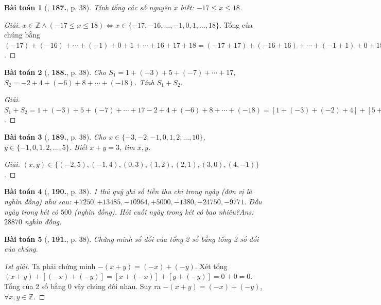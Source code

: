 \documentclass{article}
\numberwithin{equation}{section}
\newtheorem{baitoan}{Bài toán}
\begin{document}
\begin{baitoan}[\cite{Tuyen_Toan_6}, \textbf{187.}, p. 38]
	Tính tổng các số nguyên $x$ biết: $-17\le x\le18$.
\end{baitoan}

\begin{proof}[Giải]
	$x\in\mathbb{Z}\land(-17\le x\le18)\Leftrightarrow x\in\{-17,-16,\ldots,-1,0,1,\ldots,18\}$. Tổng của chúng bằng $(-17) + (-16) + \cdots + (-1) + 0 + 1 + \cdots + 16 + 17 + 18 = (-17 + 17) + (-16 + 16) + \cdots + (-1 + 1) + 0 + 18 = 0 + 0 + \cdots + 0 + 0 + 18 = 18$. 
\end{proof}

\begin{baitoan}[\cite{Tuyen_Toan_6}, \textbf{188.}, p. 38]
	Cho $S_1 = 1 + (-3) + 5 + (-7) + \cdots + 17$, $S_2 = -2 + 4 + (-6) + 8 + \cdots + (-18)$. Tính $S_1 + S_2$.
\end{baitoan}

\begin{proof}[Giải]
	$S_1 + S_2 = 1 + (-3) + 5 + (-7) + \cdots + 17 - 2 + 4 + (-6) + 8 + \cdots + (-18) = [1 + (-3) + (-2) + 4] + [5 + (-7) + (-6) + 8] + \cdots + [13 + (-15) + (-14) + 16] + [17 + (-18)] = 0 + 0 + \cdots + 0 + (-1) = -1$.
\end{proof}

\begin{baitoan}[\cite{Tuyen_Toan_6}, \textbf{189.}, p. 38]
	Cho $x\in\{-3,-2,-1,0,1,2,\ldots,10\}$, $y\in\{-1,0,1,2,\ldots,5\}$. Biết $x + y = 3$, tìm $x,y$.
\end{baitoan}

\begin{proof}[Giải]
	$(x,y)\in\{(-2,5),(-1,4),(0,3),(1,2),(2,1),(3,0),(4,-1)\}$.
\end{proof}

\begin{baitoan}[\cite{Tuyen_Toan_6}, \textbf{190.}, p. 38]
	1 thủ quỹ ghi số tiền thu chi trong ngày (đơn vị là nghìn đồng) như sau: $+7250,+13485,-10964,+5000,-1380,+24750,-9771$. Đầu ngày trong két có $500$ (nghìn đồng). Hỏi cuối ngày trong két có bao nhiêu?\hfill{\sf Ans:} $28870$ nghìn đồng.
\end{baitoan}

\begin{baitoan}[\cite{Tuyen_Toan_6}, \textbf{191.}, p. 38]
	Chứng minh số đối của tổng 2 số bằng tổng 2 số đối của chúng.
\end{baitoan}

\begin{proof}[1st giải]
	Ta phải chứng minh $-(x + y) = (-x) + (-y)$. Xét tổng $(x + y) + [(-x) + (-y)] = [x + (-x)] + [y + (-y)] = 0 + 0 = 0$. Tổng của 2 số bằng 0 vậy chúng đối nhau. Suy ra $-(x + y) = (-x) + (-y)$, $\forall x,y\in\mathbb{Z}$.
\end{proof}
\end{document}
